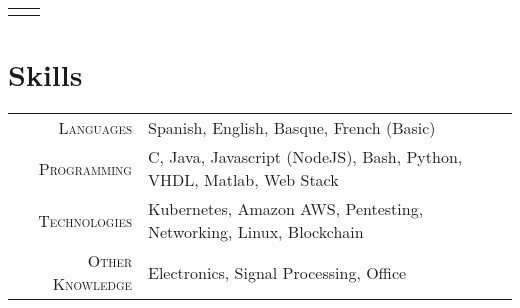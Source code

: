 \documentclass[a4paper,10pt]{article}
\begin{document}
\begin{tabular}{rp{13.3cm}}
\vspace{-.2in}
\end{tabular}


 \section{Skills}
\begin{tabular}{r|l}
\textsc{Languages} & Spanish, English, Basque, French (Basic) \\
\textsc{Programming} & C, Java, Javascript (NodeJS), Bash, Python, VHDL, Matlab, Web Stack \\
\textsc{Technologies} & Kubernetes, Amazon AWS, Pentesting, Networking, Linux, Blockchain  \\
\textsc{Other Knowledge} & Electronics, Signal Processing, Office \\
\end{tabular}

\end{document}
